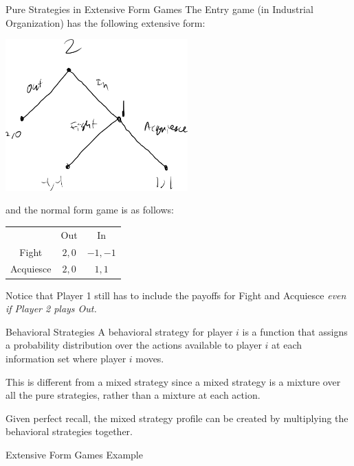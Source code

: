 \documentclass[10pt]{extarticle}
\begin{document}
\begin{problem}{Pure Strategies in Extensive Form Games}
    The Entry game (in Industrial Organization) has the following extensive form:
    \begin{center}
      \includegraphics[width=7cm]{images/entry_extensive.png}
    \end{center}
    and the normal form game is as follows:
    \begin{center}
      \renewcommand{\arraystretch}{1.5}
      \begin{tabular}{c|c|c|}
        \multicolumn{1}{c}{} & \multicolumn{1}{c}{Out} & \multicolumn{1}{c}{In}\\
        \cline{2-3}
        Fight & $2,0$ & $-1,-1$\\
        \cline{2-3}
        Acquiesce & $2,0$ & $1,1$\\
        \cline{2-3}
      \end{tabular}
    \end{center}
    Notice that Player 1 still has to include the payoffs for Fight and Acquiesce \textit{even if Player 2 plays Out.}
  \end{problem}
  \begin{problem}{Behavioral Strategies}
    A behavioral strategy for player $i$ is a function that assigns a probability distribution over the actions available to player $i$ at each information set where player $i$ moves.\newline
    
    This is different from a mixed strategy since a mixed strategy is a mixture over all the pure strategies, rather than a mixture at each action.\newline

    Given perfect recall, the mixed strategy profile can be created by multiplying the behavioral strategies together.
  \end{problem}
  \begin{problem}{Extensive Form Games Example}
    \begin{tcbraster}[raster columns = 2,colframe = black!75!white,colback=white]
    \end{tcbraster}
  \end{problem}
\end{document}
